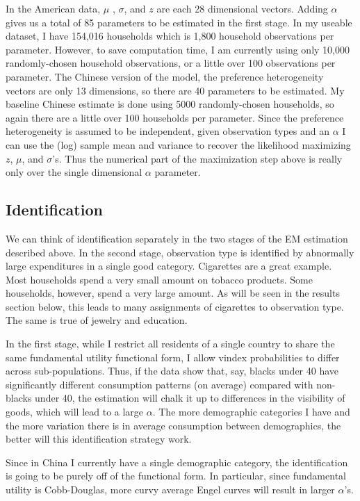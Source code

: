 \documentclass[12pt]{article}
\begin{document}
In the American data, $\mu$ , $\sigma$, and $z$ are each 28 dimensional vectors. Adding $\alpha$ gives us a total of 85 parameters to be estimated in the first stage.   
In my useable dataset, I have 154,016 households which is 1,800 household observations per parameter.
However, to save computation time, I am currently using only 10,000 randomly-chosen household observations, or a little over 100 observations per parameter.
The Chinese version of the model, the preference heterogeneity vectors are only 13 dimensions, so there are 40 parameters to be estimated.  My baseline Chinese estimate is done using 5000 randomly-chosen households, so again there are a little over 100 households per parameter.
Since the preference heterogeneity is assumed to be independent, given observation types and an $\alpha$ I can use the (log) sample mean and variance to recover the likelihood maximizing $z$, $\mu$, and $\sigma$'s.
Thus the numerical part of the maximization step above is really only over the single dimensional $\alpha$ parameter.
\subsection{Identification}
We can think of identification separately in the two stages of the EM estimation described above.  In the second stage, observation type is identified by abnormally large expenditures in a single good category.  Cigarettes are a great example.  Most households spend a very small amount on tobacco products.  Some households, however, spend a very large amount.  As will be seen in the results section below, this leads to many assignments of cigarettes to observation type.  The same is true of jewelry and education.

In the first stage, while  I restrict all residents of a single country to share the same fundamental utility functional form, I allow vindex probabilities to differ across sub-populations.  Thus, if the data show that, say, blacks under 40 have significantly different consumption patterns (on average) compared with non-blacks under 40, the estimation will chalk it up to differences in the visibility of goods, which will lead to a large $\alpha$.  The more demographic categories I have and the more variation there is in average consumption between demographics, the better will this identification strategy work. 

Since in China I currently have a single demographic category, the identification is going to be purely off of the functional form.  In particular, since fundamental utility is Cobb-Douglas, more curvy average Engel curves will result in larger $\alpha$'s.
\end{document}
